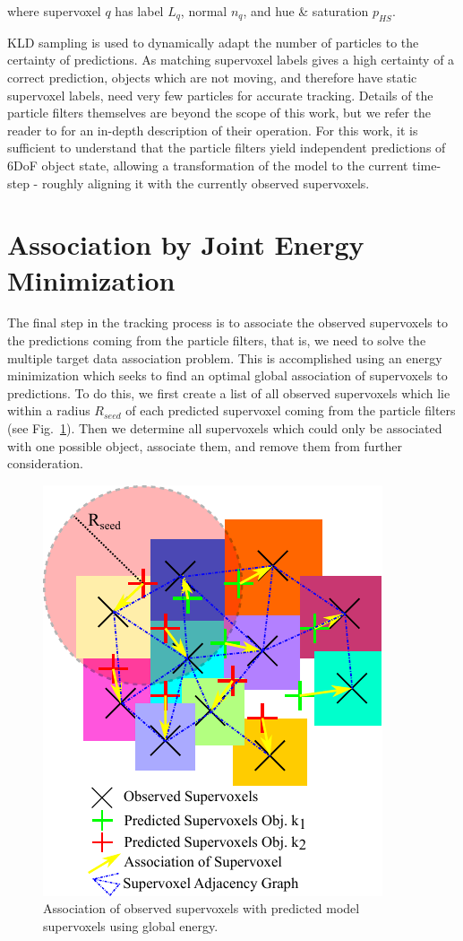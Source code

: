 where supervoxel $q$ has label $L_q$, normal $n_q$, and hue \& saturation $p_{HS}$.

KLD sampling \cite{KLDParticleFilter} is used to dynamically adapt the number of particles to the certainty of predictions. As matching supervoxel labels gives a high certainty of a correct prediction, objects which are not moving, and therefore have static supervoxel labels, need very few particles for accurate tracking. Details of the particle filters themselves are beyond the scope of this work, but we refer the reader to \cite{KLDParticleFilter} for an in-depth description of their operation. For this work, it is sufficient to understand that the particle filters yield independent predictions of 6DoF object state, allowing a transformation of the model to the current time-step - roughly aligning it with the currently observed supervoxels.  

\section{Association by Joint Energy Minimization}
The final step in the tracking process is to associate the observed supervoxels to the predictions coming from the particle filters, that is, we need to solve the multiple target data association problem. This is accomplished using an energy minimization which seeks to find an optimal global association of supervoxels to predictions. To do this, we first create a list of all observed supervoxels which lie within a radius $R_{seed}$ of each predicted supervoxel coming from the particle filters (see Fig.~\ref{fig:Association}). Then we determine all supervoxels which could only be associated with one possible object, associate them, and remove them from further consideration.

\begin{figure}[tb]
  \centering
  \includegraphics[scale=1.0]{figures/IROS2013/Association.pdf}
  \caption[Supervoxel Association]{Association of observed supervoxels with predicted model supervoxels using global energy.}
  \label{fig:Association}
\end{figure}


